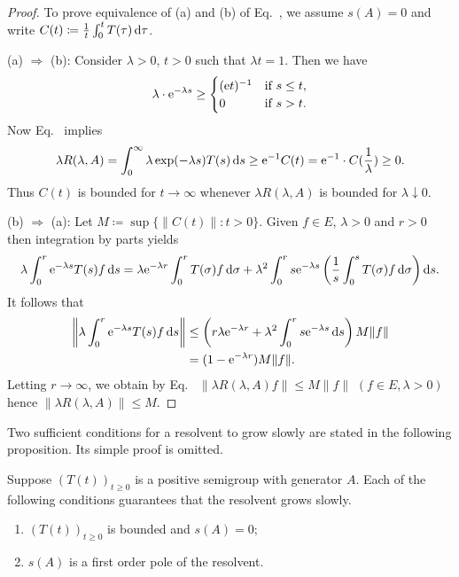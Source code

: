 \begin{proof} 
To prove equivalence of \upshape(a) and \upshape(b) of Eq.~, we assume $s(A) = 0$ and write $C(t) \coloneq \frac{1}{t} \int_{0}^{t} T(\tau) \mathop{}\!\mathrm{d}{\tau}$.

\upshape(a) $\Rightarrow$ \upshape(b): \quad 
Consider $\lambda > 0$, $t > 0$ such that $\lambda t = 1$. 
Then we have
\[
\lambda \cdot \eu^{-\lambda s} \geq 
\begin{cases}
	(\eu t)^{-1} & \text{if } s \leq t ,  \\
	0 & \text{if } s > t .
\end{cases}
\]
Now Eq.~ implies 
\[%
\lambda R(\lambda,A) = \int_{0}^{\infty} \lambda \exp(-\lambda s)T(s) \ds \geq \eu^{-1}C(t) = \eu^{-1}\cdot C(\frac{1}{\lambda}) \geq 0 .
\]
Thus $C(t)$ is bounded for $t \to \infty$ whenever $\lambda R(\lambda,A)$ is bounded for $\lambda \downarrow 0$.

\upshape(b) $\Rightarrow$ \upshape(a):\quad
 Let $M \coloneq \sup\{\|C(t)\| \colon t > 0\}$.
Given $f \in E$, $\lambda > 0$ and $r > 0$ then integration by parts yields
\[
	\lambda \int_{0}^{r} \mathrm{e}^{-\lambda s}T(s)f \mathop{}\!\mathrm{d}{s} = \lambda \mathrm{e}^{-\lambda r} \int_{0}^{r} T(\sigma)f \mathop{}\!\mathrm{d}{\sigma} + \lambda^{2}\int_{0}^{r} s\mathrm{e}^{-\lambda s}\left(\frac{1}{s}\int_{0}^{s} T(\sigma)f \mathop{}\!\mathrm{d}{\sigma}\right)\mathop{}\!\mathrm{d}{s} .
\]
It follows that
\begin{align*}
	\left\|\lambda \int_{0}^{r} \eu^{-\lambda s}T(s)f \ds\right\| &\leq \left(r\lambda \eu^{-\lambda r} + \lambda^{2}\int_{0}^{r} s\eu^{-\lambda s} \ds\right)M\|f\| \\
	&= (1 - \eu^{-\lambda r})M\|f\| .
\end{align*}
Letting $r \to \infty$, we obtain by Eq.~ $\|\lambda R(\lambda,A)f\| \leq M\|f\|$ $(f \in E, \lambda > 0)$ hence $\|\lambda R(\lambda,A)\| \leq M$.
\end{proof}
Two sufficient conditions for a resolvent to grow slowly are stated in the following proposition.
Its simple proof is omitted.
\begin{proposition}\label{prop:c3-2.9}
	Suppose $(T(t))_{t\geq 0}$ is a positive semigroup with generator $A$.
	Each of the following conditions guarantees that the resolvent grows slowly.
	\begin{enumerate}[\upshape (i)]
		\item 
		$(T(t))_{t\geq 0}$ is bounded and $s(A) = 0$;
	
		\item 
		$s(A)$ is a first order pole of the resolvent.
	\end{enumerate}
\end{proposition}
